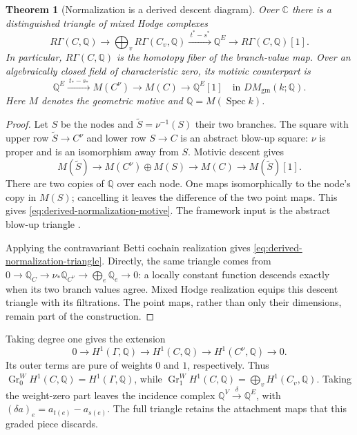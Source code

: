 \documentclass[11pt]{article}
\newtheorem{theorem}{Theorem}[section]
\theoremstyle{definition}
\theoremstyle{remark}
\newcommand{\Q}{\mathbb Q}
\newcommand{\C}{\mathbb C}
\begin{document}
\begin{theorem}[Normalization is a derived descent diagram]
\label{thm:derived-normalization}
Over $\C$ there is a distinguished triangle of mixed Hodge complexes
\begin{equation}\label{eq:derived-normalization-triangle}
 R\Gamma(C,\Q)\longrightarrow
 \bigoplus_v R\Gamma(C_v,\Q)
 \xrightarrow{\ t^*-s^*\ }\Q^E
 \longrightarrow R\Gamma(C,\Q)[1].
\end{equation}
In particular, $R\Gamma(C,\Q)$ is the homotopy fiber of the branch-value
map. Over an algebraically closed field of characteristic zero, its motivic counterpart is
\begin{equation}\label{eq:derived-normalization-motive}
 \Q^E\xrightarrow{\ t_*-s_*\ }M(C^\nu)
 \longrightarrow M(C)\longrightarrow\Q^E[1]
 \quad\text{in }DM_{\mathrm{gm}}(k;\Q).
\end{equation}
Here $M$ denotes the geometric motive and $\Q=M(\operatorname{Spec}k)$.
\end{theorem}

\begin{proof}
Let $S$ be the nodes and $\widetilde S=\nu^{-1}(S)$ their two branches.
The square with upper row $\widetilde S\to C^\nu$ and lower row $S\to C$
is an abstract blow-up square: $\nu$ is proper and is an isomorphism away
from $S$. Motivic descent gives
\[
 M(\widetilde S)\longrightarrow M(C^\nu)\oplus M(S)
 \longrightarrow M(C)\longrightarrow M(\widetilde S)[1].
\]
There are two copies of $\Q$ over each node. One maps isomorphically to
the node's copy in $M(S)$; cancelling it leaves the difference of the two
point maps. This gives \eqref{eq:derived-normalization-motive}. The
framework input is the abstract blow-up triangle
\cite[Proposition 4.1.3]{dagVoevodsky2000}.

Applying the contravariant Betti cochain realization gives
\eqref{eq:derived-normalization-triangle}. Directly, the same triangle
comes from $0\to\Q_C\to\nu_*\Q_{C^\nu}\to\bigoplus_e\Q_e\to0$:
a locally constant function descends exactly when its two branch values
agree. Mixed Hodge realization equips this descent triangle with its
filtrations. The point maps, rather than only their dimensions, remain
part of the construction.
\end{proof}

Taking degree one gives the extension
\begin{equation}\label{eq:nodal-hodge-extension}
 0\longrightarrow H^1(\Gamma,\Q)\longrightarrow H^1(C,\Q)
 \longrightarrow H^1(C^\nu,\Q)\longrightarrow0.
\end{equation}
Its outer terms are pure of weights $0$ and $1$, respectively. Thus
$\operatorname{Gr}^W_0H^1(C,\Q)=H^1(\Gamma,\Q)$, while
$\operatorname{Gr}^W_1H^1(C,\Q)=\bigoplus_vH^1(C_v,\Q)$.
Taking the weight-zero part leaves the incidence complex
$\Q^V\xrightarrow{\delta}\Q^E$, with
$(\delta a)_e=a_{t(e)}-a_{s(e)}$. The full triangle retains the
attachment maps that this graded piece discards.
\end{document}
